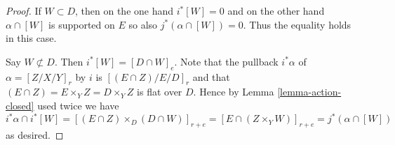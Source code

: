 \documentclass{stacks-project}
\theoremstyle{plain}
\theoremstyle{definition}
\theoremstyle{remark}
\numberwithin{equation}{subsection}
\begin{document}
\begin{proof}
\medskip\noindent
If $W \subset D$, then on the one hand $i^*[W] = 0$ and on the
other hand $\alpha \cap [W]$ is supported on $E$ so also
$j^*(\alpha \cap [W]) = 0$. Thus the equality holds in this case.

\medskip\noindent
Say $W \not \subset D$. Then $i^*[W] = [D \cap W]_e$.
Note that the pullback $i^*\alpha$ of $\alpha = [Z/X/Y]_r$
by $i$ is $[(E \cap Z)/E/D]_r$ and that
$(E \cap Z) = E \times_Y Z = D \times_Y Z$
is flat over $D$. Hence by Lemma \ref{lemma-action-closed}
used twice we have
$$
i^*\alpha \cap i^*[W] =
[(E \cap Z) \times_D (D \cap W)]_{r + e} =
[E \cap (Z \times_Y W)]_{r + e} =
j^*(\alpha \cap [W])
$$
as desired.
\end{proof}
\end{document}
